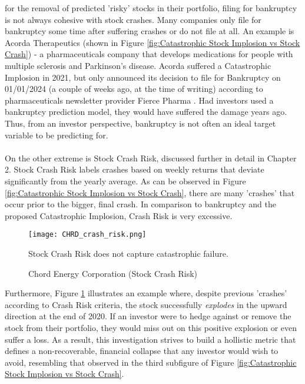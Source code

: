 \documentclass[a4paper]{report}
\begin{document}
for the removal of predicted 'risky' stocks in their portfolio, filing for bankruptcy is not always cohesive with stock crashes. Many companies only file for bankruptcy some time after suffering crashes or do not file at all. An example is Acorda Therapeutics (shown in Figure \ref{fig:Catastrophic Stock Implosion vs Stock Crash}) - a 
pharmaceuticals company that develops medications for people with multiple sclerosis and Parkinson's disease. Acorda suffered a Catastrophic Implosion in 2021, but only announced its decision to file for Bankruptcy on 01/01/2024 (a couple of weeks ago, at the time of writing) according to pharmaceuticals newsletter provider Fierce Pharma \cite{acorda}. Had investors used a bankruptcy prediction model, 
they would have suffered the damage years ago. Thus, from 
an investor perspective, bankruptcy is not often an ideal target variable to be predicting for.\\\\On the other extreme is Stock Crash Risk, discussed further in detail in Chapter 2. Stock Crash Risk 
labels crashes based on weekly returns that deviate significantly from the yearly average. As can be observed in Figure \ref{fig:Catastrophic Stock Implosion vs Stock Crash}, there are many 'crashes' that occur prior to the bigger, final crash. In comparison 
to bankruptcy and the proposed Catastrophic Implosion, Crash Risk is very excessive.\begin{figure}[htbp]
  \centering
  \texttt{[image: CHRD\_crash\_risk.png]}
  \caption{Chord Energy Corporation (Stock Crash Risk)}
  \label{fig:crash_risk_CHRD}
  \medskip %
  \begin{minipage}{0.8\textwidth} %
    \small %
    Stock Crash Risk does not capture catastrophic failure.
  \end{minipage}
\end{figure} Furthermore, Figure \ref{fig:crash_risk_CHRD} illustrates an example where, despite previous 'crashes' according to Crash Risk criteria, the stock successfully \textit{explodes} in the upward direction at the end of 2020. If an investor were to hedge against or remove the stock from their portfolio, they would miss out
on this positive explosion or even suffer a loss. As a result, this investigation strives to build a hollistic metric that defines a non-recoverable, financial collapse that any investor would wish to avoid, resembling that observed in the third subfigure of Figure \ref{fig:Catastrophic Stock Implosion vs Stock Crash}. 
\end{document}
